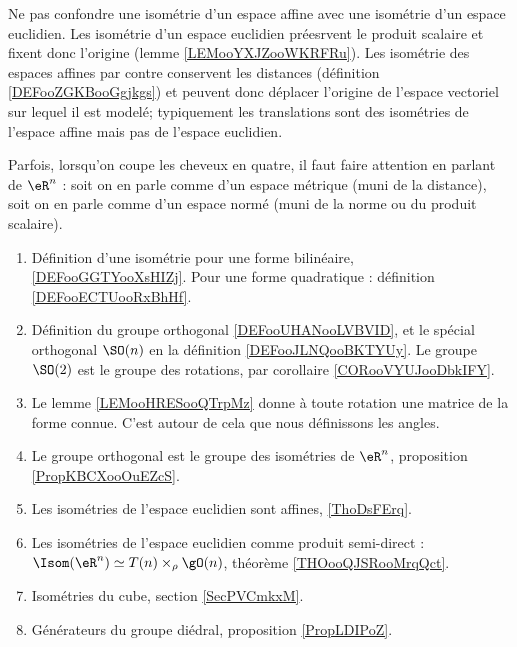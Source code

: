 
      \label{THMooVUCLooCrdbxm}

Ne pas confondre une isométrie d'un espace affine avec une isométrie d'un espace euclidien. Les isométrie d'un espace euclidien préesrvent le produit scalaire et fixent donc l'origine (lemme \ref{LEMooYXJZooWKRFRu}). Les isométrie des espaces affines par contre conservent les distances (définition \ref{DEFooZGKBooGgjkgs}) et peuvent donc déplacer l'origine de l'espace vectoriel sur lequel il est modelé; typiquement les translations sont des isométries de l'espace affine mais pas de l'espace euclidien.

Parfois, lorsqu'on coupe les cheveux en quatre, il faut faire attention en parlant de \( \eR^n\) : soit on en parle comme d'un espace métrique (muni de la distance), soit on en parle comme d'un espace normé (muni de la norme ou du produit scalaire).

\begin{enumerate}
    \item 
        Définition d'une isométrie pour une forme bilinéaire, \ref{DEFooGGTYooXsHIZj}. Pour une forme quadratique : définition \ref{DEFooECTUooRxBhHf}.
    \item
        Définition du groupe orthogonal \ref{DEFooUHANooLVBVID}, et le spécial orthogonal \( \SO(n)\) en la définition \ref{DEFooJLNQooBKTYUy}. Le groupe \( \SO(2)\) est le groupe des rotations, par corollaire \ref{CORooVYUJooDbkIFY}.
    \item
        Le lemme \ref{LEMooHRESooQTrpMz} donne à toute rotation une matrice de la forme connue. C'est autour de cela que nous définissons les angles.
    \item
        Le groupe orthogonal est le groupe des isométries de \( \eR^n\), proposition \ref{PropKBCXooOuEZcS}.
    \item
        Les isométries de l'espace euclidien sont affines, \ref{ThoDsFErq}.
    \item
        Les isométries de l'espace euclidien comme produit semi-direct : $\Isom(\eR^n)\simeq T(n)\times_{\rho}\gO(n)$, théorème \ref{THOooQJSRooMrqQct}.
    \item
        Isométries du cube, section \ref{SecPVCmkxM}.
    \item 
        Générateurs du groupe diédral, proposition \ref{PropLDIPoZ}.
\end{enumerate}

